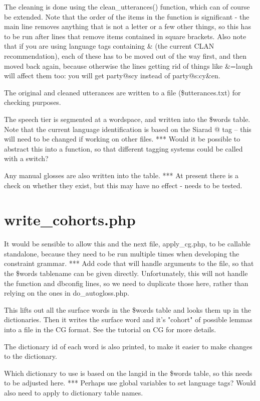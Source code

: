 \documentclass[a4paper,10pt]{article}
\begin{document}
The cleaning is done using the clean\_utterances() function, which can of course be extended.  Note that the order of the items in the function is significant - the main line removes anything that is not a letter or a few other things, so this has to be run after lines that remove items contained in square brackets.  Also note that if you are using language tags containing \& (the current CLAN recommendation), each of these has to be moved out of the way first, and then moved back again, because otherwise the lines getting rid of things like \&=laugh will affect them too: you will get party@scy instead of party@s:cy\&en.

The original and cleaned utterances are written to a file (\$utterances.txt) for checking purposes.

The speech tier is segmented at a wordspace, and written into the \$words table.  Note that the current language identification is based on the Siarad @ tag -- this will need to be changed if working on other files.
*** Would it be possible to abstract this into a function, so that different tagging systems could be called with a switch?

Any manual glosses are also written into the table.
*** At present there is a check on whether they exist, but this may have no effect - needs to be tested.


\section{write\_cohorts.php}
\label{sec:cohorts}

It would be sensible to allow this and the next file, apply\_cg.php, to be callable standalone, because they need to be run multiple times when developing the constraint grammar.
*** Add code that will handle arguments to the file, so that the \$words tablename can be given directly.  Unfortunately, this will not handle the function and dbconfig lines, so we need to duplicate those here, rather than relying on the ones in do\_autogloss.php.

This lifts out all the surface words in the \$words table and looks them up in the dictionaries.  Then it writes the surface word and it's "cohort" of possible lemmas into a file in the CG format.  See the tutorial on CG for more details.

The dictionary id of each word is also printed, to make it easier to make changes to the dictionary.

Which dictionary to use is based on the langid in the \$words table, so this needs to be adjusted here.
*** Perhaps use global variables to set language tags?  Would also need to apply to dictionary table names.
\end{document}
